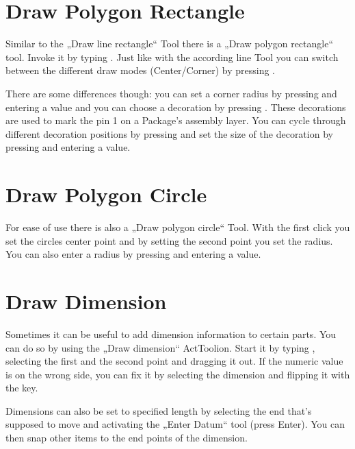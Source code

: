 \documentclass[letterpaper,10pt,czech]{sphinxmanual}
\begin{document}
\section{Draw Polygon Rectangle}
\label{\detokenize{drawing:draw-polygon-rectangle}}


Similar to the „Draw line rectangle“ Tool there is a „Draw polygon rectangle“ tool. Invoke it by typing . Just like with the according line Tool you can switch between the different draw modes (Center/Corner) by pressing .

There are some differences though: you can set a corner radius by pressing  and entering a value and you can choose a decoration by pressing . These decorations are used to mark the pin 1 on a Package’s assembly layer. You can cycle through different decoration positions by pressing  and set the size of the decoration by pressing  and entering a value.


\section{Draw Polygon Circle}
\label{\detokenize{drawing:draw-polygon-circle}}


For ease of use there is also a „Draw polygon circle“ Tool. With the first click you set the circles center point and by setting the second point you set the radius. You can also enter a radius by pressing  and entering a value.


\section{Draw Dimension}
\label{\detokenize{drawing:draw-dimension}}


Sometimes it can be useful to add dimension information to certain parts. You can do so by using the „Draw dimension“ ActToolion. Start it by typing , selecting the first and the second point and dragging it out. If the numeric value is on the wrong side, you can fix it by selecting the dimension and flipping it with the  key.

Dimensions can also be set to specified length by selecting the end that’s supposed to move and activating the „Enter Datum“ tool (press Enter). You can then snap other items to the end points of the dimension.
\end{document}
